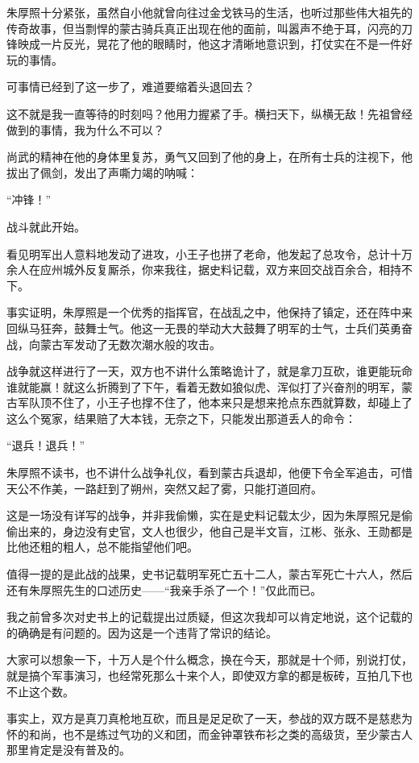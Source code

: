 \begin{multicols}{\theparacolNo}
朱厚照十分紧张，虽然自小他就曾向往过金戈铁马的生活，也听过那些伟大祖先的传奇故事，但当剽悍的蒙古骑兵真正出现在他的面前，叫嚣声不绝于耳，闪亮的刀锋映成一片反光，晃花了他的眼睛时，他这才清晰地意识到，打仗实在不是一件好玩的事情。

可事情已经到了这一步了，难道要缩着头退回去？

这不就是我一直等待的时刻吗？他用力握紧了手。横扫天下，纵横无敌！先祖曾经做到的事情，我为什么不可以？

尚武的精神在他的身体里复苏，勇气又回到了他的身上，在所有士兵的注视下，他拔出了佩剑，发出了声嘶力竭的呐喊：

“冲锋！”

战斗就此开始。

看见明军出人意料地发动了进攻，小王子也拼了老命，他发起了总攻令，总计十万余人在应州城外反复厮杀，你来我往，据史料记载，双方来回交战百余合，相持不下。

事实证明，朱厚照是一个优秀的指挥官，在战乱之中，他保持了镇定，还在阵中来回纵马狂奔，鼓舞士气。他这一无畏的举动大大鼓舞了明军的士气，士兵们英勇奋战，向蒙古军发动了无数次潮水般的攻击。

战争就这样进行了一天，双方也不讲什么策略诡计了，就是拿刀互砍，谁更能玩命谁就能赢！就这么折腾到了下午，看着无数如狼似虎、浑似打了兴奋剂的明军，蒙古军队顶不住了，小王子也撑不住了，他本来只是想来抢点东西就算数，却碰上了这么个冤家，结果赔了大本钱，无奈之下，只能发出那道丢人的命令：

“退兵！退兵！”

朱厚照不读书，也不讲什么战争礼仪，看到蒙古兵退却，他便下令全军追击，可惜天公不作美，一路赶到了朔州，突然又起了雾，只能打道回府。

这是一场没有详写的战争，并非我偷懒，实在是史料记载太少，因为朱厚照兄是偷偷出来的，身边没有史官，文人也很少，他自己是半文盲，江彬、张永、王勋都是比他还粗的粗人，总不能指望他们吧。

值得一提的是此战的战果，史书记载明军死亡五十二人，蒙古军死亡十六人，然后还有朱厚照先生的口述历史——“我亲手杀了一个！”仅此而已。

我之前曾多次对史书上的记载提出过质疑，但这次我却可以肯定地说，这个记载的的确确是有问题的。因为这是一个违背了常识的结论。

大家可以想象一下，十万人是个什么概念，换在今天，那就是十个师，别说打仗，就是搞个军事演习，也经常死那么十来个人，即使双方拿的都是板砖，互拍几下也不止这个数。

事实上，双方是真刀真枪地互砍，而且是足足砍了一天，参战的双方既不是慈悲为怀的和尚，也不是练过气功的义和团，而金钟罩铁布衫之类的高级货，至少蒙古人那里肯定是没有普及的。


\end{multicols}

